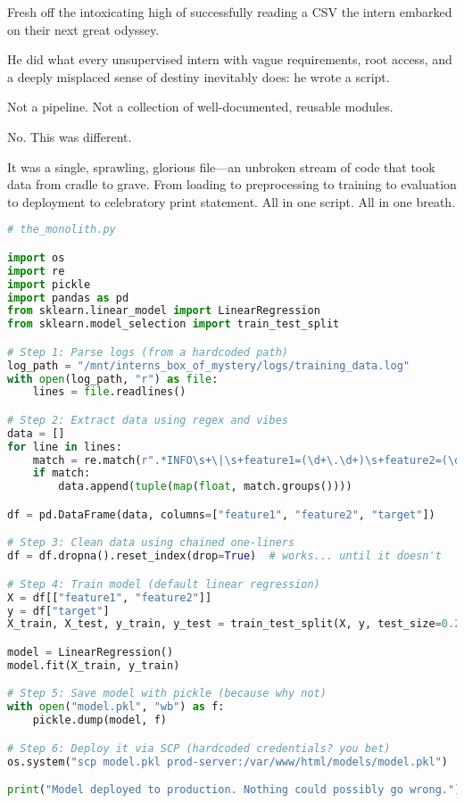 Fresh off the intoxicating high of successfully reading a CSV the intern embarked on their next great odyssey.

He did what every unsupervised intern with vague requirements, root access, and a deeply misplaced sense of destiny inevitably does: he wrote a script.

Not a pipeline. Not a collection of well-documented, reusable modules.

No. This was different.

It was a single, sprawling, glorious file—an unbroken stream of code that took data from cradle to grave. From loading to preprocessing to training to evaluation to deployment to celebratory print statement. All in one script. All in one breath.


\begin{lstlisting}[language=Python]
# the_monolith.py

import os
import re
import pickle
import pandas as pd
from sklearn.linear_model import LinearRegression
from sklearn.model_selection import train_test_split

# Step 1: Parse logs (from a hardcoded path)
log_path = "/mnt/interns_box_of_mystery/logs/training_data.log"
with open(log_path, "r") as file:
    lines = file.readlines()

# Step 2: Extract data using regex and vibes
data = []
for line in lines:
    match = re.match(r".*INFO\s+\|\s+feature1=(\d+\.\d+)\s+feature2=(\d+\.\d+)\s+target=(\d+\.\d+)", line)
    if match:
        data.append(tuple(map(float, match.groups())))

df = pd.DataFrame(data, columns=["feature1", "feature2", "target"])

# Step 3: Clean data using chained one-liners
df = df.dropna().reset_index(drop=True)  # works... until it doesn't

# Step 4: Train model (default linear regression)
X = df[["feature1", "feature2"]]
y = df["target"]
X_train, X_test, y_train, y_test = train_test_split(X, y, test_size=0.2)

model = LinearRegression()
model.fit(X_train, y_train)

# Step 5: Save model with pickle (because why not)
with open("model.pkl", "wb") as f:
    pickle.dump(model, f)

# Step 6: Deploy it via SCP (hardcoded credentials? you bet)
os.system("scp model.pkl prod-server:/var/www/html/models/model.pkl")

print("Model deployed to production. Nothing could possibly go wrong.")
\end{lstlisting}


